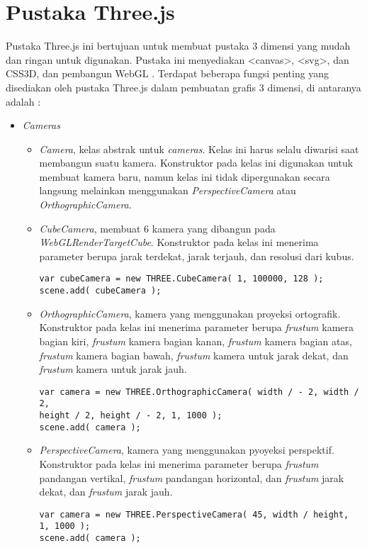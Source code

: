 \section{Pustaka Three.js}
\label{sec:latex}
Pustaka Three.js ini bertujuan untuk membuat pustaka 3 dimensi yang mudah dan ringan untuk digunakan. Pustaka ini menyediakan <canvas>, <svg>, dan CSS3D, dan pembangun WebGL \cite{githubthreejs}.
Terdapat beberapa fungsi penting yang disediakan oleh pustaka Three.js dalam pembuatan grafis 3 dimensi, di antaranya adalah \cite{threejs}:
\begin{itemize}

\item \textit{Cameras}

	\begin{itemize}
	\item {\it Camera}, kelas abstrak untuk {\it cameras}. Kelas ini harus selalu diwarisi saat membangun suatu kamera. Konstruktor pada kelas ini digunakan untuk membuat kamera baru, namun kelas ini tidak dipergunakan secara langsung melainkan menggunakan {\it PerspectiveCamera} atau {\it OrthographicCamera}.
	
	\item {\it CubeCamera}, membuat 6 kamera yang dibangun pada {\it WebGLRenderTargetCube}. Konstruktor pada kelas ini menerima parameter berupa jarak terdekat, jarak terjauh, dan resolusi dari kubus.
	\begin{lstlisting}[caption={Contoh instansiasi kelas {\it CubeCamera}.},captionpos=b]
var cubeCamera = new THREE.CubeCamera( 1, 100000, 128 );
scene.add( cubeCamera );
\end{lstlisting}
	
	\item{\it OrthographicCamera}, kamera yang menggunakan proyeksi ortografik. Konstruktor pada kelas ini menerima parameter berupa {\it frustum} kamera bagian kiri, {\it frustum} kamera bagian kanan, {\it frustum} kamera bagian atas, {\it frustum} kamera bagian bawah, {\it frustum} kamera untuk jarak dekat, dan {\it frustum} kamera untuk jarak jauh.
\begin{lstlisting}[caption={Contoh instansiasi kelas {\it OrthographicCamera}},captionpos=b]
var camera = new THREE.OrthographicCamera( width / - 2, width / 2, 
height / 2, height / - 2, 1, 1000 );
scene.add( camera );
\end{lstlisting}
	
	\item {\it PerspectiveCamera}, kamera yang menggunakan pyoyeksi perspektif. Konstruktor pada kelas ini menerima parameter berupa {\it frustum} pandangan vertikal, {\it frustum} pandangan horizontal, dan {\it frustum} jarak dekat, dan {\it frustum} jarak jauh.
\begin{lstlisting}[caption={Contoh instansiasi kelas {\it PerspectiveCamera}},captionpos=b]
var camera = new THREE.PerspectiveCamera( 45, width / height, 
1, 1000 );
scene.add( camera );
\end{lstlisting}
	

\end{itemize}
\end{itemize}
